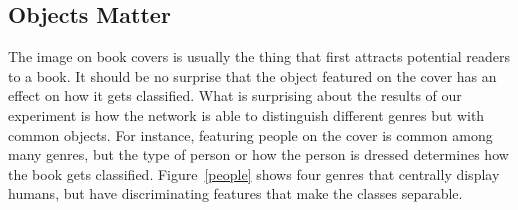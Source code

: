 \documentclass[conference]{IEEEtran}
\begin{document}
\subsection{Objects Matter}
The image on book covers is usually the thing that first attracts potential readers to a book.
It should be no surprise that the object featured on the cover has an effect on how it gets classified.
What is surprising about the results of our experiment is how the network is able to distinguish different genres but with common objects.
For instance, featuring people on the cover is common among many genres, but the type of person or how the person is dressed determines how the book gets classified.
Figure~\ref{people} shows four genres that centrally display humans, but have discriminating features that make the classes separable.
\end{document}
